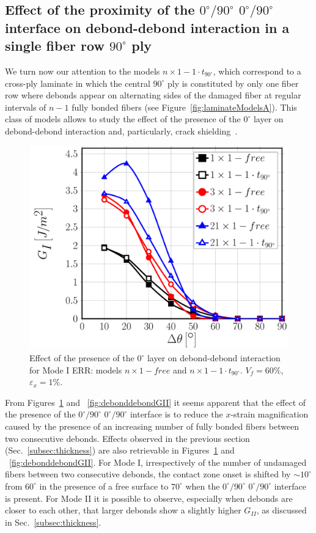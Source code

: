 \documentclass[review]{elsarticle}
\begin{document}
\subsection{Effect of the proximity of the $0^{\circ}/90^{\circ}$ $0^{\circ}/90^{\circ}$ interface on debond-debond interaction in a single fiber row $90^{\circ}$ ply}\label{subsec:debonddebondinter}

We turn now our attention to the models $n\times 1-1\cdot t_{90^{\circ}}$, which correspond to a cross-ply laminate in which the central $90^{\circ}$ ply is constituted by only one fiber row where debonds appear on alternating sides of the damaged fiber at regular intervals of $n-1$ fully bonded fibers (see Figure~\ref{fig:laminateModelsA}). This class of models allows to study the effect of the presence of the $0^{\circ}$ layer on debond-debond interaction and, particularly, crack shielding~\cite{Garcia2015,DiStasio2019}.

\begin{figure}[!h]
\centering
\includegraphics[width=\textwidth]{nx1-1-vf60-GI.pdf}
\caption{Effect of the presence of the $0^{\circ}$ layer on debond-debond interaction for Mode I ERR: models $n\times 1-free$ and $n\times 1-1\cdot t_{90^{\circ}}$. $V_{f}=60\%$, $\varepsilon_{x}=1\%$.}\label{fig:debonddebondGI}
\end{figure}

From Figures~\ref{fig:debonddebondGI} and ~\ref{fig:debonddebondGII} it seems apparent that the effect of the presence of the $0^{\circ}/90^{\circ}$ $0^{\circ}/90^{\circ}$ interface is to reduce the $x$-strain magnification caused by the presence of an increasing number of fully bonded fibers between two consecutive debonds. Effects observed in the previous section (Sec.~\ref{subsec:thickness}) are also retrievable in Figures~\ref{fig:debonddebondGI} and ~\ref{fig:debonddebondGII}. For Mode I, irrespectively of the number of undamaged fibers between two consecutive debonds, the contact zone onset is shifted by $\sim10^{\circ}$ from $60^{\circ}$ in the presence of a free surface to $70^{\circ}$ when the $0^{\circ}/90^{\circ}$ $0^{\circ}/90^{\circ}$ interface is present. For Mode II it is possible to observe, especially when debonds are closer to each other, that larger debonds show a slightly higher $G_{II}$, as discussed in Sec.~\ref{subsec:thickness}.
\end{document}
